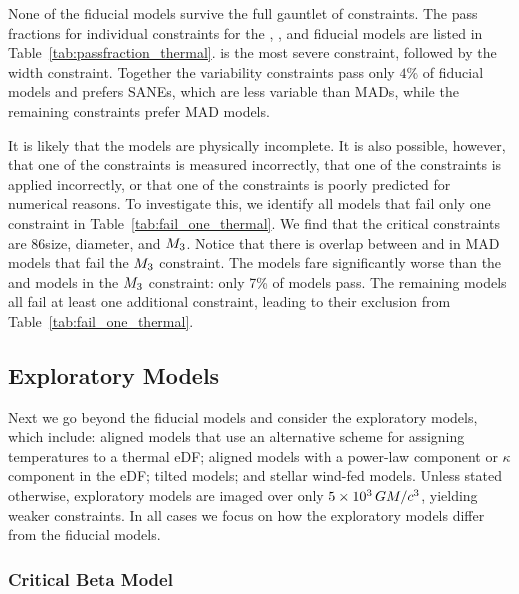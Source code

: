 None of the fiducial models  survive the full gauntlet of constraints. The pass fractions for individual constraints for the \bhac, \kharma, and \hamr fiducial models are listed in Table~\ref{tab:passfraction_thermal}.
 is the most severe constraint, followed by the \mring width constraint.
Together the variability constraints pass only $4\%$ of fiducial models and prefers SANEs, which are less variable than MADs, while the remaining constraints prefer MAD models.

It is likely that the models are physically incomplete.
It is also possible, however, that one of the constraints is measured incorrectly, that one of the constraints is applied incorrectly, or that one of the constraints is poorly predicted for numerical reasons.
To investigate this, we identify all models that fail only one constraint in Table~\ref{tab:fail_one_thermal}.
We find that the critical constraints are 86\GHz size, \mring diameter, and $M_{3}$.
Notice that there is overlap between \kharma and \bhac in MAD models that fail the $M_{3}$ constraint.
The \hamr models fare significantly worse than the \kharma and \bhac models in the $M_{3}$ constraint: only 7\% of models pass. The remaining models all fail at least one additional constraint, leading to their exclusion from Table~\ref{tab:fail_one_thermal}.

\subsection{Exploratory Models}\label{sec:explore}

Next we go beyond the fiducial models and consider the exploratory models, which include: aligned models that use an alternative scheme for assigning temperatures to a thermal eDF; aligned models with a power-law component or $\kappa$ component in the eDF; tilted models; and stellar wind-fed models.
Unless stated otherwise, exploratory models are imaged over only $5 \times 10^3\,GM/c^3$, yielding weaker constraints.  In all cases we focus on how the exploratory models differ from the fiducial models.

\subsubsection{Critical Beta Model}

